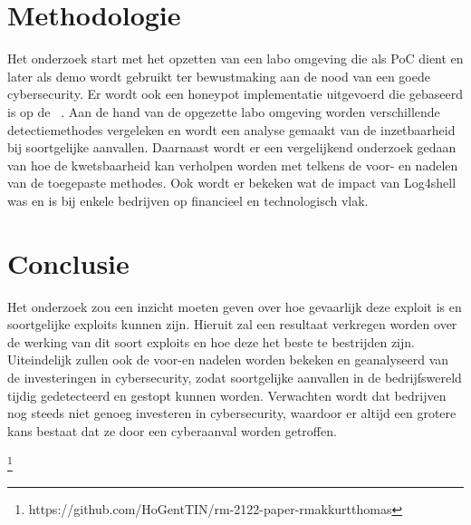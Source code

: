 \documentclass{hogent-article}
\begin{document}
\section{Methodologie}

Het onderzoek start met het opzetten van een labo omgeving die als PoC dient en later als demo wordt gebruikt ter bewustmaking aan de nood van een goede cybersecurity. Er wordt ook een honeypot implementatie uitgevoerd die gebaseerd is op de ~\textcite{Patzke2022}.
Aan de hand van de opgezette labo omgeving worden verschillende detectiemethodes vergeleken en wordt een analyse gemaakt van de inzetbaarheid bij soortgelijke aanvallen. Daarnaast wordt er een vergelijkend onderzoek gedaan van hoe de kwetsbaarheid kan verholpen worden met telkens de voor- en nadelen van de toegepaste methodes. Ook wordt er bekeken wat de impact van Log4shell was en is bij enkele bedrijven op financieel en technologisch vlak.

\section{Conclusie}

Het onderzoek zou een inzicht moeten geven over hoe gevaarlijk deze exploit is en soortgelijke exploits kunnen zijn. Hieruit zal een resultaat verkregen worden over de werking van dit soort exploits en hoe deze het beste te bestrijden zijn. Uiteindelijk zullen ook de voor-en nadelen worden bekeken en geanalyseerd van de investeringen in cybersecurity, zodat soortgelijke aanvallen in de bedrijfswereld tijdig gedetecteerd en gestopt kunnen worden. Verwachten wordt dat bedrijven nog steeds niet genoeg investeren in cybersecurity, waardoor er altijd een grotere kans bestaat dat ze door een cyberaanval worden getroffen.


\printbibliography[heading=bibintoc]

\footnote{https://github.com/HoGentTIN/rm-2122-paper-rmakkurtthomas}
\end{document}
